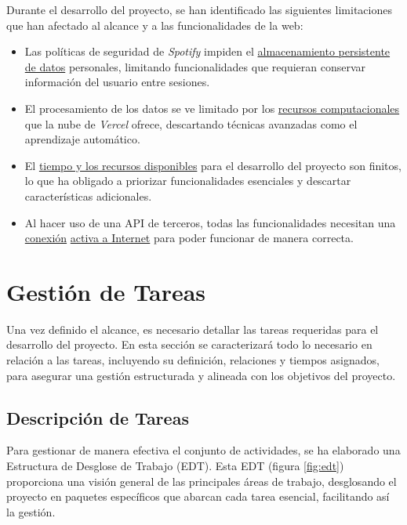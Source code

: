 Durante el desarrollo del proyecto, se han identificado las siguientes limitaciones que han afectado al alcance y a las funcionalidades de la web:

\begin{itemize}
    \item Las políticas de seguridad de \textit{Spotify} impiden el \underline{almacenamiento persistente de datos} personales, limitando funcionalidades que requieran conservar información del usuario entre sesiones.

    \item El procesamiento de los datos se ve limitado por los \underline{recursos computacionales} que la nube de \textit{Vercel} ofrece, descartando técnicas avanzadas como el aprendizaje automático.

    \item El \underline{tiempo y los recursos disponibles} para el desarrollo del proyecto son finitos, lo que ha obligado a priorizar funcionalidades esenciales y descartar características adicionales.

    \item Al hacer uso de una API de terceros, todas las funcionalidades necesitan una \underline{conexión} \underline{activa a Internet} para poder funcionar de manera correcta.
\end{itemize}

\section{Gestión de Tareas}

Una vez definido el alcance, es necesario detallar las tareas requeridas para el desarrollo del proyecto. En esta sección se caracterizará todo lo necesario en relación a las tareas, incluyendo su definición, relaciones y tiempos asignados, para asegurar una gestión estructurada y alineada con los objetivos del proyecto.

\subsection{Descripción de Tareas}

Para gestionar de manera efectiva el conjunto de actividades, se ha elaborado una Estructura de Desglose de Trabajo (EDT). Esta EDT (figura \ref{fig:edt}) proporciona una visión general de las principales áreas de trabajo, desglosando el proyecto en paquetes específicos que abarcan cada tarea esencial, facilitando así la gestión.

